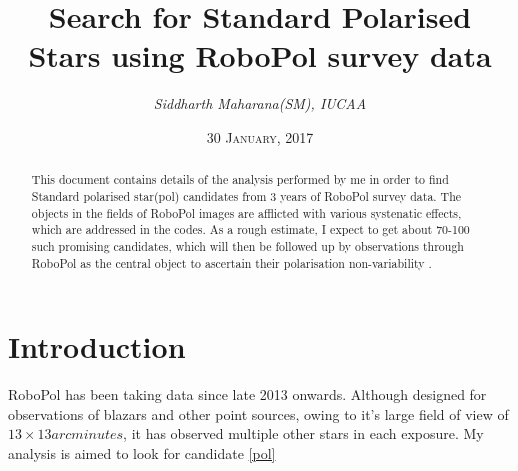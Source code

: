 \documentclass[a4paper,10pt]{article}
\title{\textbf{Search for Standard Polarised Stars using RoboPol survey data}}
\author{\small{\textit{Siddharth Maharana(SM), IUCAA}} \\
\date{\small{\textsc{30 January, 2017}}}
}
\begin{document}
\maketitle{ }

\begin{abstract}
This document contains details of the analysis performed by me in order to find {Standard polarised star\labe(pol)} candidates from 3 years of RoboPol survey data. The objects in the fields 
of RoboPol images are afflicted with various systenatic effects, which are addressed in the codes. As a rough 
estimate, I expect to get about 70-100 such promising candidates, which will then be followed up by observations through RoboPol as the central object to ascertain their polarisation 
non-variability .    
\end{abstract}

\section{Introduction}

RoboPol has been taking data since late 2013 onwards. Although designed for observations of blazars and other point sources, owing to it's large field of view 
of $13\times13 arcminutes$, it has observed multiple other stars in each exposure. My analysis is aimed to look for candidate \ref{pol}
\end{document}
